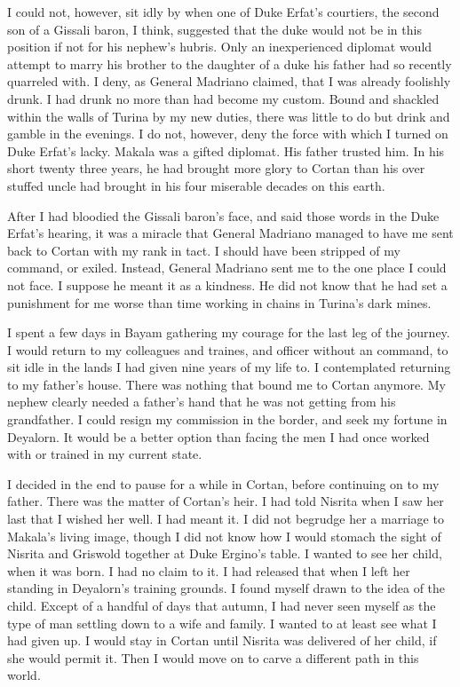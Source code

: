 \documentclass{article}
\begin{document}
I could not, however, sit idly by when one of Duke Erfat's courtiers, the second son of a Gissali baron, I think, suggested that the duke would not be in this position if not for his nephew's hubris. Only an inexperienced diplomat would attempt to marry his brother to the daughter of a duke his father had so recently quarreled with. I deny, as General Madriano claimed, that I was already foolishly drunk. I had drunk no more than had become my custom. Bound and shackled within the walls of Turina by my new duties, there was little to do but drink and gamble in the evenings. I do not, however, deny the force with which I turned on Duke Erfat's lacky. Makala was a gifted diplomat. His father trusted him. In his short twenty three years, he had brought more glory to Cortan than his over stuffed uncle had brought in his four miserable decades on this earth.

After I had bloodied the Gissali baron's face, and said those words in the Duke Erfat's hearing, it was a miracle that General Madriano managed to have me sent back to Cortan with my rank in tact. I should have been stripped of my command, or exiled. Instead, General Madriano sent me to the one place I could not face. I suppose he meant it as a kindness. He did not know that he had set a punishment for me worse than time working in chains in Turina's dark mines.

I spent a few days in Bayam gathering my courage for the last leg of the journey. I would return to my colleagues and traines, and officer without an command, to sit idle in the lands I had given nine years of my life to. I contemplated returning to my father's house. There was nothing that bound me to Cortan anymore. My nephew clearly needed a father's hand that he was not getting from his grandfather. I could resign my commission in the border, and seek my fortune in Deyalorn. It would be a better option than facing the men I had once worked with or trained in my current state.

I decided in the end to pause for a while in Cortan, before continuing on to my father. There was the matter of Cortan's heir. I had told Nisrita when I saw her last that I wished her well. I had meant it. I did not begrudge her a marriage to Makala's living image, though I did not know how I would stomach the sight of Nisrita and Griswold together at Duke Ergino's table. I wanted to see her child, when it was born. I had no claim to it. I had released that when I left her standing in Deyalorn's training grounds. I found myself drawn to the idea of the child. Except of a handful of days that autumn, I had never seen myself as the type of man settling down to a wife and family. I wanted to at least see what I had given up. I would stay in Cortan until Nisrita was delivered of her child, if she would permit it. Then I would move on to carve a different path in this world.
\end{document}
